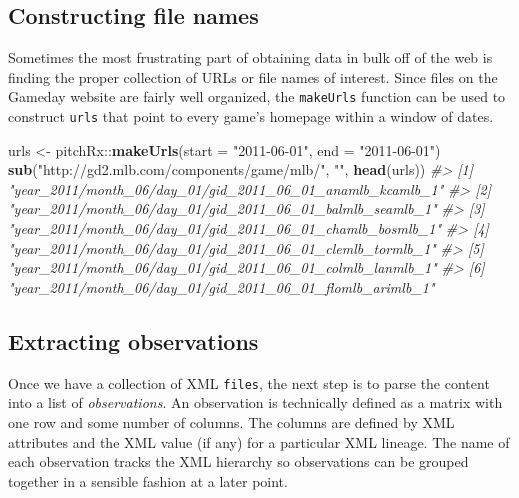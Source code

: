 \documentclass[12pt,]{isuthesis}
\newenvironment{Shaded}{\begin{snugshade}}{\end{snugshade}}
\newcommand{\KeywordTok}[1]{\textcolor[rgb]{0.13,0.29,0.53}{\textbf{{#1}}}}
\newcommand{\DataTypeTok}[1]{\textcolor[rgb]{0.13,0.29,0.53}{{#1}}}
\newcommand{\StringTok}[1]{\textcolor[rgb]{0.31,0.60,0.02}{{#1}}}
\newcommand{\CommentTok}[1]{\textcolor[rgb]{0.56,0.35,0.01}{\textit{{#1}}}}
\newcommand{\NormalTok}[1]{{#1}}
\begin{document}
\subsection{Constructing file names}\label{constructing-file-names}

Sometimes the most frustrating part of obtaining data in bulk off of the
web is finding the proper collection of URLs or file names of interest.
Since files on the Gameday website are fairly well organized, the
\texttt{makeUrls} function can be used to construct \texttt{urls} that
point to every game's homepage within a window of dates.

\begin{Shaded}
\begin{Highlighting}[]
\NormalTok{urls <-}\StringTok{ }\NormalTok{pitchRx::}\KeywordTok{makeUrls}\NormalTok{(}\DataTypeTok{start =} \StringTok{"2011-06-01"}\NormalTok{, }\DataTypeTok{end =} \StringTok{"2011-06-01"}\NormalTok{) }
\KeywordTok{sub}\NormalTok{(}\StringTok{"http://gd2.mlb.com/components/game/mlb/"}\NormalTok{, }\StringTok{""}\NormalTok{, }\KeywordTok{head}\NormalTok{(urls))}
\CommentTok{#> [1] "year_2011/month_06/day_01/gid_2011_06_01_anamlb_kcamlb_1"}
\CommentTok{#> [2] "year_2011/month_06/day_01/gid_2011_06_01_balmlb_seamlb_1"}
\CommentTok{#> [3] "year_2011/month_06/day_01/gid_2011_06_01_chamlb_bosmlb_1"}
\CommentTok{#> [4] "year_2011/month_06/day_01/gid_2011_06_01_clemlb_tormlb_1"}
\CommentTok{#> [5] "year_2011/month_06/day_01/gid_2011_06_01_colmlb_lanmlb_1"}
\CommentTok{#> [6] "year_2011/month_06/day_01/gid_2011_06_01_flomlb_arimlb_1"}
\end{Highlighting}
\end{Shaded}

\subsection{Extracting observations}\label{extracting-observations}

Once we have a collection of XML \texttt{files}, the next step is to
parse the content into a list of \textit{observations}. An observation
is technically defined as a matrix with one row and some number of
columns. The columns are defined by XML attributes and the XML value (if
any) for a particular XML lineage. The name of each observation tracks
the XML hierarchy so observations can be grouped together in a sensible
fashion at a later point.
\end{document}
